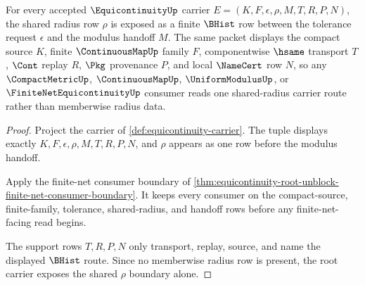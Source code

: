 \begin{theorem}
\label{thm:equicontinuity-root-unblock-shared-radius-carrier}
For every accepted $\EquicontinuityUp$ carrier $E=(K,F,\epsilon,\rho,M,T,R,P,N)$, the shared radius row $\rho$ is exposed as a finite $\BHist$ row between the tolerance request $\epsilon$ and the modulus handoff $M$. The same packet displays the compact source $K$, finite $\ContinuousMapUp$ family $F$, componentwise $\hsame$ transport $T$, $\Cont$ replay $R$, $\Pkg$ provenance $P$, and local $\NameCert$ row $N$, so any $\CompactMetricUp$, $\ContinuousMapUp$, $\UniformModulusUp$, or $\FiniteNetEquicontinuityUp$ consumer reads one shared-radius carrier route rather than memberwise radius data.
\end{theorem}
\begin{proof}
Project the carrier of \autoref{def:equicontinuity-carrier}. The tuple displays exactly $K,F,\epsilon,\rho,M,T,R,P,N$, and $\rho$ appears as one row before the modulus handoff.

Apply the finite-net consumer boundary of \autoref{thm:equicontinuity-root-unblock-finite-net-consumer-boundary}. It keeps every consumer on the compact-source, finite-family, tolerance, shared-radius, and handoff rows before any finite-net-facing read begins.

The support rows $T,R,P,N$ only transport, replay, source, and name the displayed $\BHist$ route. Since no memberwise radius row is present, the root carrier exposes the shared $\rho$ boundary alone.
\end{proof}

